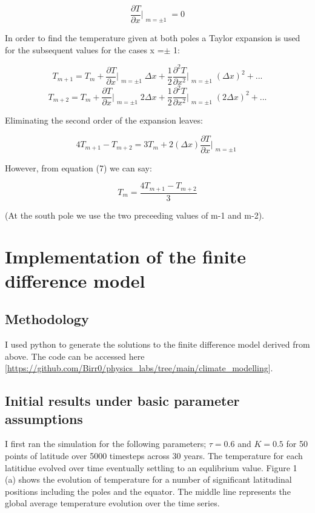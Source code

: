 \documentclass{article}%
\begin{document}
\begin{equation}
  \frac{\partial T}{\partial x} \Bigr|_{\substack{m = \pm 1}} = 0
\end{equation}

In order to find the temperature given at both poles a Taylor expansion is used for the subsequent values for the cases x =$\pm$ 1:

$$T_{m+1} = T_{m} + \frac{\partial T}{\partial x} \Bigr|_{\substack{m = \pm 1}} \Delta x + \frac{1}{2} \frac{\partial^2 T}{\partial x^2} \Bigr|_{\substack{m = \pm 1}}(\Delta x)^2 + ...$$
$$T_{m+2} = T_{m} + \frac{\partial T}{\partial x} \Bigr|_{\substack{m = \pm 1}} 2\Delta x + \frac{1}{2} \frac{\partial^2 T}{\partial x^2} \Bigr|_{\substack{m = \pm 1}}(2\Delta x)^2 + ...$$

Eliminating the second order of the expansion leaves:

$$ 4T_{m+1} - T_{m+2} = 3T_{m} + 2(\Delta x)\frac{\partial T}{\partial x} \Bigr|_{\substack{m = \pm 1}} $$

However, from equation (7) we can say:

\begin{equation}
  T_{m} = \frac{4T_{m+1} - T_{m+2}}{3}
\end{equation}

(At the south pole we use the two preceeding values of m-1 and m-2).


\section{Implementation of the finite difference model}
\subsection{Methodology}
I used python to generate the solutions to the finite difference model derived from above. The code can be accessed here [\url{https://github.com/Birr0/physics_labs/tree/main/climate_modelling}].

\subsection{Initial results under basic parameter assumptions}
I first ran the simulation for the following parameters;
$\tau = 0.6$ and $K = 0.5$ for 50 points of latitude over 5000 timesteps across 30 years.
The temperature for each latitidue evolved over time eventually settling to an equlibrium value.
Figure 1 (a) shows the evolution of temperature for a number of significant latitudinal positions including the poles and the equator. 
The middle line represents the global average temperature evolution over the time series.
\end{document}

